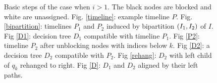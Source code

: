 \begin{figure}[htp]
\begin{minipage}[t]{0.4\textwidth}
    \caption[Resulting decision tree $D$]{}\label{D}
\end{minipage}
\caption[Basic steps of \texttt{DPTimelines} procedure]{Basic steps of the case when $i>1$. The black nodes are blocked and white are unassigned. Fig. \ref{timeline}: example timeline $P$. Fig. \ref{bipartition}: timelines $P_1$ and $P_2$ induced by bipartition $\mathopen{}\left( I_1,I_2 \right)$ of $I$. Fig \ref{D1}: decision tree $D_1$ compatible with timeline $P_1$. Fig \ref{P2}: timeline $P_2$ after unblocking nodes with indices below $k$. Fig \ref{D2}: a decision tree $D_2$ compatible with $P_2$. Fig \ref{rehang}: $D_2$ with left child of $q_k$ rehanged to right. Fig \ref{D}: $D_1$ and $D_2$ aligned by their left paths.}\label{dp_timelines_figure}
\end{figure}